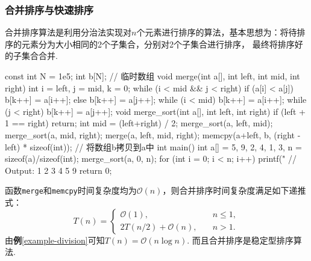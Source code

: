 \documentclass[12pt, a4paper, oneside]{ctexart}
\numberwithin{equation}{section}  %
\theoremstyle{definition}
\let\leq=\leqslant %
\def\O{\mathcal{O}}         %
\begin{document}
\subsubsection{合并排序与快速排序}
合并排序算法是利用分治法实现对$n$个元素进行排序的算法，基本思想为：将待排序的元素分为大小相同的2个子集合，分别对2个子集合进行排序，
最终将排序好的子集合合并.
\begin{cppcode}
const int N = 1e5;
int b[N];  // 临时数组
void merge(int a[], int left, int mid, int right) {
    int i = left, j = mid, k = 0;
    while (i < mid && j < right) {
        if (a[i] < a[j]) b[k++] = a[i++];
        else b[k++] = a[j++];
    }
    while (i < mid) b[k++] = a[i++];
    while (j < right) b[k++] = a[j++];
}
void merge_sort(int a[], int left, int right) {
    if (left + 1 == right) return;
    int mid = (left+right) / 2;
    merge_sort(a, left, mid);
    merge_sort(a, mid, right);
    merge(a, left, mid, right);
    memcpy(a+left, b, (right - left) * sizeof(int));  // 将数组b拷贝到a中
}
int main() {
    int a[] = {5, 9, 2, 4, 1, 3}, n = sizeof(a)/sizeof(int);
    merge_sort(a, 0, n);
    for (int i = 0; i < n; i++) printf("%
    // Output: 1 2 3 4 5 9
    return 0;
}
\end{cppcode}
函数\texttt{merge}和\texttt{memcpy}时间复杂度均为$\O(n)$，则合并排序时间复杂度满足如下递推式：
\begin{equation*}
    T(n) = \begin{cases}
        \O(1),&\quad n \leq 1,\\
        2T(n/2) + \O(n),&\quad n > 1.
    \end{cases}
\end{equation*}
由\textbf{例}\ref{example-division}可知$T(n) = \O(n\log n)$. 而且合并排序是稳定型排序算法.
\end{document}
